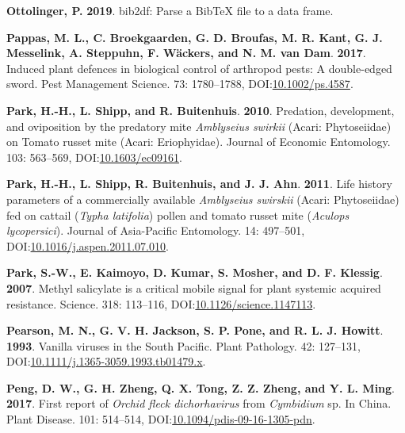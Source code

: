 \documentclass[12pt,final,CPage]{ufthesis}
\newlength{\cslhangindent}
\newenvironment{CSLReferences}[2] %
{%
	\setlength{\parindent}{0pt}
	\ifodd #1 \everypar{\setlength{\hangindent}{\cslhangindent}}\ignorespaces\fi
	\ifnum #2 > 0
	\setlength{\parskip}{#2\baselineskip}
	\fi
}%
{}
\begin{document}
{\begin{CSLReferences}{1}{0}
  \leavevmode{}%
  \textbf{Ottolinger, P.} \textbf{2019}. {bib2df}: Parse a {BibTeX} file to a data frame.

  \leavevmode{}%
  \textbf{Pappas, M. L., C. Broekgaarden, G. D. Broufas, M. R. Kant, G. J. Messelink, A. Steppuhn, F. Wäckers, and N. M. van Dam}. \textbf{2017}. Induced plant defences in biological control of arthropod pests: A double-edged sword. Pest Management Science. 73: 1780--1788, DOI:\href{https://doi.org/10.1002/ps.4587}{10.1002/ps.4587}.

  \leavevmode{}%
  \textbf{Park, H.-H., L. Shipp, and R. Buitenhuis}. \textbf{2010}. Predation, development, and oviposition by the predatory mite {\emph{Amblyseius swirkii}} ({Acari}: {Phytoseiidae}) on {Tomato russet mite} ({Acari}: {Eriophyidae}). Journal of Economic Entomology. 103: 563--569, DOI:\href{https://doi.org/10.1603/ec09161}{10.1603/ec09161}.

  \leavevmode{}%
  \textbf{Park, H.-H., L. Shipp, R. Buitenhuis, and J. J. Ahn}. \textbf{2011}. Life history parameters of a commercially available {\emph{Amblyseius swirskii}} ({Acari}: {Phytoseiidae}) fed on cattail ({\emph{Typha latifolia}}) pollen and tomato russet mite ({\emph{Aculops lycopersici}}). Journal of Asia-Pacific Entomology. 14: 497--501, DOI:\href{https://doi.org/10.1016/j.aspen.2011.07.010}{10.1016/j.aspen.2011.07.010}.

  \leavevmode{}%
  \textbf{Park, S.-W., E. Kaimoyo, D. Kumar, S. Mosher, and D. F. Klessig}. \textbf{2007}. Methyl salicylate is a critical mobile signal for plant systemic acquired resistance. Science. 318: 113--116, DOI:\href{https://doi.org/10.1126/science.1147113}{10.1126/science.1147113}.

  \leavevmode{}%
  \textbf{Pearson, M. N., G. V. H. Jackson, S. P. Pone, and R. L. J. Howitt}. \textbf{1993}. Vanilla viruses in the {South Pacific}. Plant Pathology. 42: 127--131, DOI:\href{https://doi.org/10.1111/j.1365-3059.1993.tb01479.x}{10.1111/j.1365-3059.1993.tb01479.x}.

  \leavevmode{}%
  \textbf{Peng, D. W., G. H. Zheng, Q. X. Tong, Z. Z. Zheng, and Y. L. Ming}. \textbf{2017}. First report of {\emph{Orchid fleck dichorhavirus}} from {\emph{Cymbidium}} sp. In {China}. Plant Disease. 101: 514--514, DOI:\href{https://doi.org/10.1094/pdis-09-16-1305-pdn}{10.1094/pdis-09-16-1305-pdn}.


\end{CSLReferences}}
\end{document}
